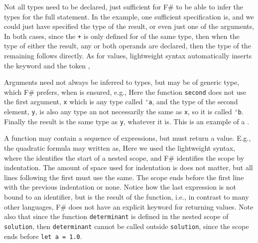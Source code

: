 Not all types need to be declared, just sufficient for F\# to be able to infer the types for the full statement. In the example, one sufficient specification is, and we could just have specified the type of the result,
%
%
or even just one of the arguments,
%
%
In both cases, since the \lstinline|+|  is only defined for  of the same type, then when the type of either the result, any or both operands are declared, then the type of the remaining follows directly.  As for values, lightweight syntax automatically inserts the keyword  and the token \token{;},
%
%

Arguments need not always be inferred to types, but may be of generic type, which F\# prefers, when  is ensured, e.g.,
%
%
Here the function \lstinline{second} does not use the first argument, \lstinline{x} which is any type called \lstinline{'a}, and the type of the second element, \lstinline{y}, is also any type an not necessarily the same as \lstinline!x!, so it is called \lstinline!'b!. Finally the result is the same type as \lstinline!y!, whatever it is. This is an example of a .

A function may contain a sequence of expressions, but must return a value. E.g., the quadratic formula may written as, 
%
%
Here we used the lightweight syntax, where the \token{=} identifies the start of a nested scope, and F\# identifies the scope by indentation. The amount of space used for indentation is does not matter, but all lines following the first must use the same. The scope ends before the first line with the previous indentation or none. Notice how the last expression is not bound to an identifier, but is the result of the function, i.e., in contrast to many other languages, F\# does not have an explicit keyword for returning values. Note also that since the function \lstinline!determinant! is defined in the nested scope of \lstinline!solution!, then  \lstinline!determinant! cannot be called outside \lstinline!solution!, since the scope ends before \lstinline!let a = 1.0!.

